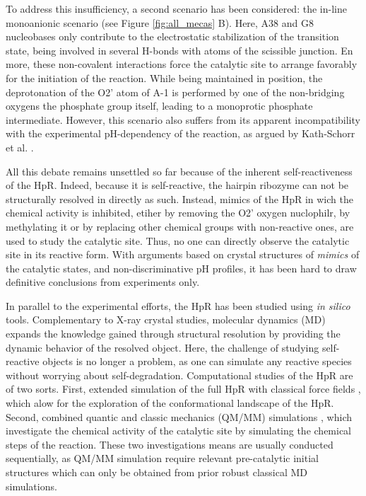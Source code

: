 \documentclass[journal=jacsat,manuscript=article]{achemso}
\begin{document}
To address this insufficiency, a second scenario has been considered: the in-line monoanionic scenario (see Figure \ref{fig:all_mecas} B). 
Here, A38 and G8 nucleobases only contribute to the electrostatic stabilization of the transition state, 
being involved in several H-bonds with atoms of the scissible junction. 
En more, these non-covalent interactions force the catalytic site to arrange favorably for the initiation of the reaction.
While being maintained in position, 
the deprotonation of the O2' atom of A-1 is performed by one of the non-bridging oxygens the phosphate group itself, 
leading to a monoprotic phosphate intermediate. 
However, this scenario also suffers from its apparent incompatibility with the experimental pH-dependency of the reaction, 
as argued by Kath-Schorr et al. \cite{kath-schorr_general_2012}.

All this debate remains unsettled so far because of the inherent self-reactiveness of the HpR. 
Indeed, because it is self-reactive, the hairpin ribozyme can not be structurally resolved in directly as such.
Instead, mimics of the HpR in wich the chemical activity is inhibited, etiher by removing the O2' oxygen nuclophilr, by methylating it
or by replacing other chemical groups with non-reactive ones, are used to study the catalytic site.
Thus, no one can directly observe the catalytic site in its reactive form.
With arguments based on crystal structures of \textit{mimics} of the catalytic states,
and non-discriminative pH profiles, it has been hard to draw definitive conclusions from experiments only.

In parallel to the experimental efforts, the HpR has been studied using \textit{in silico} tools.
Complementary to X-ray crystal studies, molecular dynamics (MD) expands the knowledge gained through structural resolution
by providing the dynamic behavior of the resolved object. 
Here, the challenge of studying self-reactive objects is no longer a problem,
as one can simulate any reactive species without worrying about self-degradation. 
Computational studies of the HpR are of two sorts. First, extended simulation of the full HpR with classical force fields \cite{mlynsky_extensive_2010, mlynsky_reactive_2015,kumar_mechanistic_2018}, 
which alow for the exploration of the conformational landscape of the HpR\cite{mlynsky_extensive_2010, mlynsky_reactive_2015,kumar_mechanistic_2018}.
Second, combined quantic and classic mechanics (QM/MM) simulations 
\cite{ mlynsky_comparison_2014, mlynsky_qmmm_2011, nam_electrostatic_2008, nam_electrostatic_2009,kumar_deciphering_2020},
which investigate the chemical activity of the catalytic site by simulating the chemical steps of the reaction.
These two investigations means are usually conducted sequentially, 
as QM/MM simulation require relevant pre-catalytic initial structures which can only be obtained from prior robust classical MD simulations.
\end{document}
